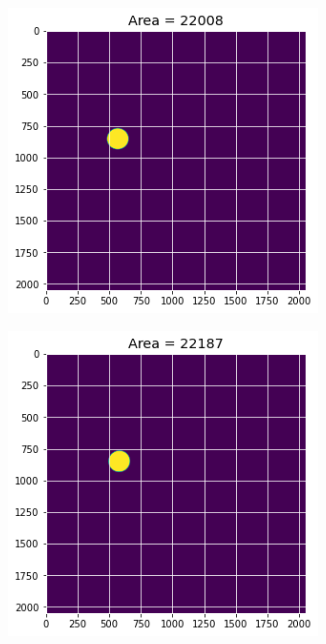 \documentclass[12pt, a4paper]{report}
\begin{document}
\begin{figure}[H]
\begin{subfigure}{.24\textwidth}
  \label{img:microstrImg}
\end{subfigure}
\begin{subfigure}{.24\textwidth}
  \centering
  \includegraphics[width=0.9\textwidth]{Pictures/Growth/1.3.jpeg}
  \label{img:microstrImg}
\end{subfigure}
\begin{subfigure}{.24\textwidth}
  \centering
  \includegraphics[width=0.9\textwidth]{Pictures/Growth/1.4.jpeg}
  \label{img:microstrImg}
\end{subfigure}
\label{fig:test}
\end{figure}
\end{document}
